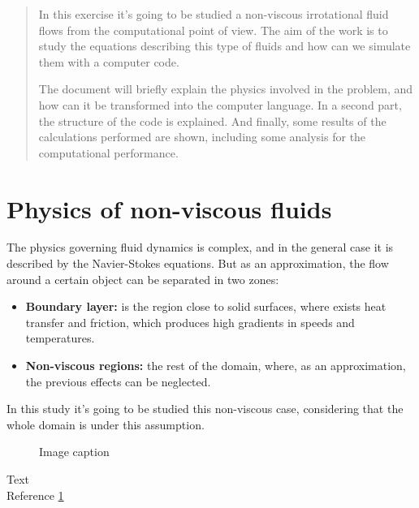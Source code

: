 \begin{abstract}
In this exercise it's going to be studied a non-viscous irrotational fluid flows
from the computational point of view. The aim of the work is to study the equations
describing this type of fluids and how can we simulate them with a computer code.

The document will briefly explain the physics involved in the problem,
and how can it be transformed into the computer language. In a second part, the structure
of the code is explained. And finally, some results of the calculations
performed are shown, including some analysis for the computational performance.
\end{abstract}

\section{Physics of non-viscous fluids}

The physics governing fluid dynamics is complex, and in the general case it is
described by the Navier-Stokes equations. But as an approximation, the flow
around a certain object can be separated in two zones:
\begin{itemize}
	\item \textbf{Boundary layer:} is the region close to solid surfaces, where
	exists heat transfer and friction, which produces high gradients in speeds
	and temperatures.
	\item \textbf{Non-viscous regions:} the rest of the domain, where, as an
	approximation, the previous effects can be neglected.
\end{itemize}

In this study it's going to be studied this non-viscous case, considering that the
whole domain is under this assumption.




\begin{figure}[h]
	\centering
	\caption[short caption]{Image caption}
	\label{fig:}
\end{figure}

Text\\

Reference \ref{fig:}\\
